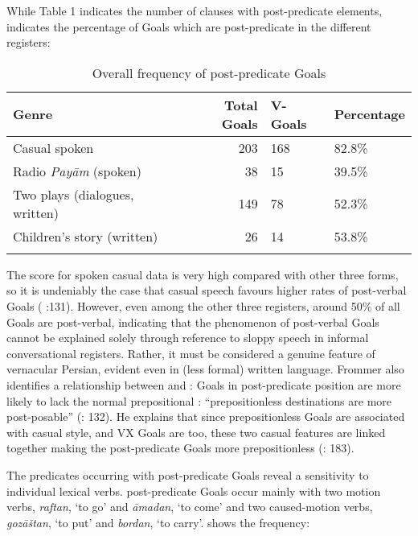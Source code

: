 \documentclass[output=paper,colorlinks,citecolor=brown,draftmode]{langscibook}
\begin{document}
While Table 1 indicates the number of clauses with post-predicate elements,  indicates the percentage of Goals which are post-predicate in the different registers:


\begin{table}
 \begin{tabularx}{\textwidth}{lrYY}
\lsptoprule
Genre & Total Goals & V-Goals & Percentage \\
\midrule
Casual spoken & 203 & 168 & 82.8\% \\
Radio \textit{Payām} (spoken) & 38 & 15 & 39.5\% \\
Two plays (dialogues, written) & 149 & 78 & 52.3\% \\
Children's story (written) & 26 & 14 & 53.8\% \\
\lspbottomrule
 \end{tabularx}
 \caption{Overall frequency of post-predicate Goals \citep[131]{frommer_post-verbal_1981}}
 \label{Persian:tab:2}
\end{table}

The score for spoken casual data is very high compared with other three forms, so it is undeniably the case that casual speech favours higher rates of post-verbal Goals (\citealt{frommer_post-verbal_1981} :131). However, even among the other three registers, around 50\% of all Goals are post-verbal, indicating that the phenomenon of post-verbal Goals cannot be explained solely through reference to sloppy speech in informal conversational registers. Rather, it must be considered a genuine feature of vernacular Persian, evident even in (less formal) written language. Frommer also identifies a relationship between  and : Goals in post-predicate position are more likely to lack the normal prepositional : ``prepositionless destinations are more post-posable'' (\citealt{frommer_post-verbal_1981}: 132). He explains that since prepositionless Goals are associated with casual style, and VX Goals are too, these two casual features are linked together making the post-predicate Goals more prepositionless (\citealt{frommer_post-verbal_1981}: 183). 

The predicates occurring with post-predicate Goals reveal a sensitivity to individual lexical verbs. post-predicate Goals occur mainly with two motion verbs, \textit{raftan}, `to go' and \textit{āmadan}, `to come' and two caused-motion verbs, \textit{gozāštan}, `to put' and \textit{bordan}, `to carry'.  shows the frequency:
\end{document}
